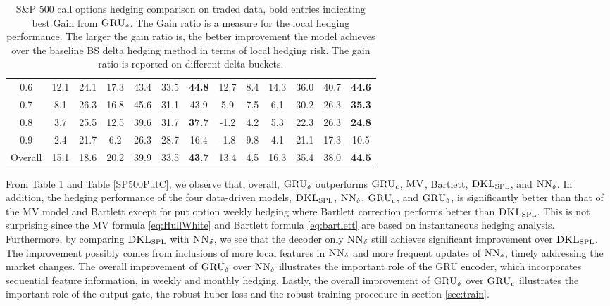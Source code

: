 \documentclass[letterpaper,12pt,titlepage,oneside,final]{book}
\numberwithin{equation}{section}
\theoremstyle{definition}
\newcommand{\model}{\textsc{GRU}_\delta}
\newcommand{\modelN}{\textsc{NN}_\delta}
\newcommand{\DKLs}{\bf\textsc{DKL}_{\text{SPL}}}
\newcommand{\MV}{\bf \textsc{MV}}
\begin{document}
\begin{table}[htp!]
\begin{threeparttable}
\begin{tabular}{|c|cccccc| cccccc|}
			0.6 &12.1 &24.1   &17.3     &43.4  &33.5 &\textbf{44.8}    &12.7  & 8.4  &14.3 &36.0       &40.7  & \textbf{44.6}  \\
			
			0.7 &8.1  &26.3   &16.8         &45.6  & 31.1 &43.9    &5.9   & 7.5   &6.1  &30.2        &26.3 & \textbf{35.3}  \\
			
			0.8 &3.7  &25.5   &12.5     &39.6  &31.7 &\textbf{37.7}   &-1.2  & 4.2   &5.3      &22.3         &26.3 & \textbf{24.8}  \\
			
			0.9 &2.4  &21.7   &6.2      &26.3 &28.7&16.4     &-1.8  &9.8    &4.1  &21.1       & 17.3& 10.5  \\
			
			Overall&15.1&18.6 &20.2     &39.9 &33.5  &\textbf{43.7}    &13.4  & 4.5   &16.3 &35.4     &38.0    & \textbf{44.5}  \\
			\hline
		\end{tabular}
		\caption{S\&P 500 call options hedging comparison on traded data, bold entries indicating best Gain from $\model$.  The Gain ratio is a measure for the local hedging performance. The larger the gain ratio is, the better improvement the model achieves over the baseline BS delta hedging method in terms of local hedging risk. The gain ratio is reported on different delta buckets.  }
\label{SP500CallC}
\end{threeparttable}
\end{table}


 From  Table \ref{SP500CallC} and Table \ref{SP500PutC},  we observe that, overall, $\model$ outperforms $\textsc{GRU}_{c}$, $\MV$, Bartlett, $\DKLs$, and $\modelN$. In addition,
 the hedging performance of the four data-driven models, $\DKLs$, $\modelN$, $\textsc{GRU}_{c}$, and $\model$, is   significantly better than that of the MV model and Bartlett except for put option weekly hedging where Bartlett correction performs better than $\DKLs$. This is not surprising since the MV formula \eqref{eq:HullWhite} and Bartlett formula \eqref{eq:bartlett} are based on instantaneous hedging analysis.  Furthermore, by comparing $\DKLs$ with $\modelN$, we  see that the decoder only $\modelN$ still achieves significant improvement over $\DKLs$. The improvement possibly comes from inclusions of more local features in $\modelN$ and more frequent updates of $\modelN$, timely addressing the market changes. The overall improvement of $\model$ over $\modelN$ illustrates the important role of the GRU encoder, which incorporates sequential feature information, in weekly and monthly hedging. Lastly,  the overall improvement of $\model$ over $\textsc{GRU}_{c}$ illustrates the important role of the output gate, the robust huber loss and the robust training procedure in section \ref{sec:train}.
\end{document}
